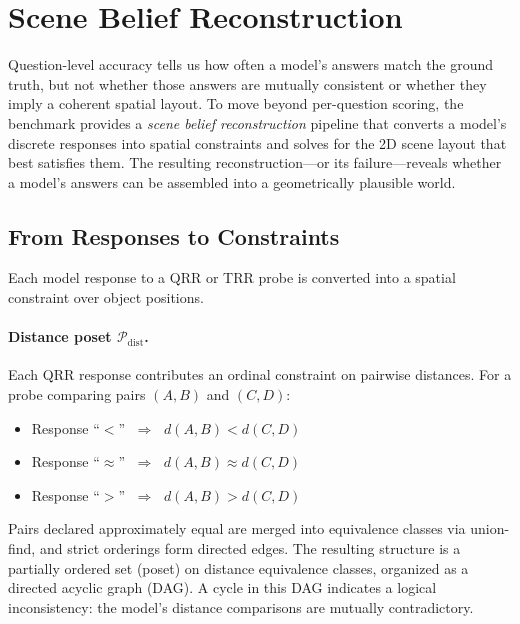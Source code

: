 
\section{Scene Belief Reconstruction}
\label{sec:reconstruction}

Question-level accuracy tells us how often a model's answers match the ground truth, but not whether those answers are mutually consistent or whether they imply a coherent spatial layout. To move beyond per-question scoring, the benchmark provides a \emph{scene belief reconstruction} pipeline that converts a model's discrete responses into spatial constraints and solves for the 2D scene layout that best satisfies them. The resulting reconstruction---or its failure---reveals whether a model's answers can be assembled into a geometrically plausible world.

\subsection{From Responses to Constraints}
\label{sec:constraints}

Each model response to a QRR or TRR probe is converted into a spatial constraint over object positions.

\paragraph{Distance poset $\mathcal{P}_{\mathrm{dist}}$.}
Each QRR response contributes an ordinal constraint on pairwise distances. For a probe comparing pairs $(A,B)$ and $(C,D)$:
\begin{itemize}[nosep]
  \item Response ``$<$'' $\;\Rightarrow\;$ $d(A,B) < d(C,D)$
  \item Response ``$\approx$'' $\;\Rightarrow\;$ $d(A,B) \approx d(C,D)$
  \item Response ``$>$'' $\;\Rightarrow\;$ $d(A,B) > d(C,D)$
\end{itemize}
Pairs declared approximately equal are merged into equivalence classes via union-find, and strict orderings form directed edges. The resulting structure is a partially ordered set (poset) on distance equivalence classes, organized as a directed acyclic graph (DAG). A cycle in this DAG indicates a logical inconsistency: the model's distance comparisons are mutually contradictory.

